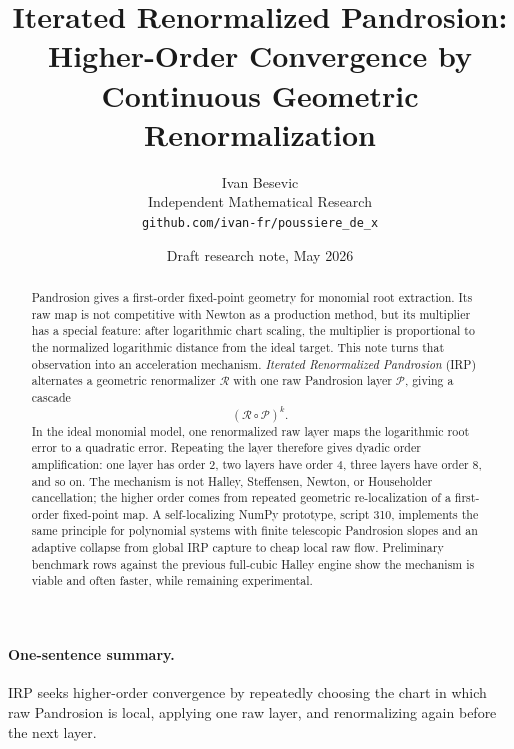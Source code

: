 \documentclass[11pt]{article}
\title{Iterated Renormalized Pandrosion:\\ Higher-Order Convergence by Continuous Geometric Renormalization}
\author{Ivan Besevic\\Independent Mathematical Research\\\texttt{github.com/ivan-fr/poussiere\_de\_x}}
\date{Draft research note, May 2026}
\newcommand{\cR}{\mathcal{R}}
\newcommand{\cP}{\mathcal{P}}
\begin{document}
\maketitle

\begin{abstract}
Pandrosion gives a first-order fixed-point geometry for monomial root extraction.  Its raw map is not competitive with Newton as a production method, but its multiplier has a special feature: after logarithmic chart scaling, the multiplier is proportional to the normalized logarithmic distance from the ideal target.  This note turns that observation into an acceleration mechanism.  \emph{Iterated Renormalized Pandrosion} (IRP) alternates a geometric renormalizer $\cR$ with one raw Pandrosion layer $\cP$, giving a cascade
\[
  (\cR\circ\cP)^k.
\]
In the ideal monomial model, one renormalized raw layer maps the logarithmic root error to a quadratic error.  Repeating the layer therefore gives dyadic order amplification: one layer has order $2$, two layers have order $4$, three layers have order $8$, and so on.  The mechanism is not Halley, Steffensen, Newton, or Householder cancellation; the higher order comes from repeated geometric re-localization of a first-order fixed-point map.  A self-localizing NumPy prototype, script 310, implements the same principle for polynomial systems with finite telescopic Pandrosion slopes and an adaptive collapse from global IRP capture to cheap local raw flow.  Preliminary benchmark rows against the previous full-cubic Halley engine show the mechanism is viable and often faster, while remaining experimental.
\end{abstract}

\paragraph{One-sentence summary.}
IRP seeks higher-order convergence by repeatedly choosing the chart in which raw Pandrosion is local, applying one raw layer, and renormalizing again before the next layer.
\end{document}
